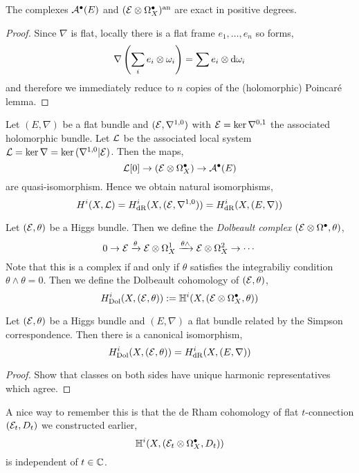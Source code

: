 \documentclass[12pt]{article}
\begin{document}
\begin{lemma}[Poincar\'{e}]
The complexes $\mathcal{A}^\bullet(E)$ and $(\mathcal{E} \otimes \Omega_X^\bullet)^{\mathrm{an}}$ are exact in positive degrees.
\end{lemma}

\begin{proof}
Since $\nabla$ is flat, locally there is a flat frame $e_1, \dots, e_n$ so forms,
\[ \nabla \left( \sum_i e_i \otimes \omega_i \right) = \sum e_i \otimes \mathrm{d}{\omega_i} \]
and therefore we immediately reduce to $n$ copies of the (holomorphic) Poincar\'{e} lemma. 
\end{proof}

\begin{cor}
Let $(E, \nabla)$ be a flat bundle and $(\mathcal{E}, \nabla^{1,0})$ with $\mathcal{E} = \ker{\nabla^{0,1}}$ the associated holomorphic bundle. Let $\mathcal{L}$ be the associated local system $\mathcal{L} = \ker{\nabla} = \ker{(\nabla^{1,0} | \mathcal{E})}$. Then the maps,
\[ \mathcal{L}[0] \to (\mathcal{E} \otimes \Omega_X^\bullet) \to \mathcal{A}^\bullet(E) \]
are quasi-isomorphism. Hence we obtain natural isomorphisms,
\[ H^i(X, \mathcal{L}) = H^i_{\mathrm{dR}}(X, (\mathcal{E}, \nabla^{1,0})) = H^i_{\mathrm{dR}}(X, (E, \nabla)) \]
\end{cor}

\begin{defn}
Let $(\mathcal{E}, \theta)$ be a Higgs bundle. Then we define the \textit{Dolbeault complex} $(\mathcal{E} \otimes \Omega^\bullet, \theta)$,
\[ 0 \to \mathcal{E} \xrightarrow{\theta} \mathcal{E} \otimes \Omega^1_X \xrightarrow{\theta \wedge} \mathcal{E} \otimes \Omega^2_X \to \cdots \]
Note that this is a complex if and only if $\theta$ satisfies the integrabiliy condition $\theta \wedge \theta = 0$. Then we define the Dolbeault cohomology of $(\mathcal{E}, \theta)$,
\[ H_{\mathrm{Dol}}^i(X, (\mathcal{E}, \theta)) := \mathbb{H}^i(X, (\mathcal{E} \otimes \Omega_X^\bullet, \theta)) \]
\end{defn}

\begin{theorem}
Let $(\mathcal{E}, \theta)$ be a Higgs bundle and $(E, \nabla)$ a flat bundle related by the Simpson correspondence. Then there is a canonical isomorphism,
\[ H^i_{\mathrm{Dol}}(X, (\mathcal{E}, \theta)) = H^i_{\mathrm{dR}}(X, (E, \nabla)) \]
\end{theorem}

\begin{proof}
Show that classes on both sides have unique harmonic representatives which agree. 
\end{proof}

\begin{rmk}
A nice way to remember this is that the de Rham cohomology of flat $t$-connection $(\mathcal{E}_t, D_t)$ we constructed earlier,
\[ \mathbb{H}^i(X, (\mathcal{E}_t \otimes \Omega_X^\bullet, D_t)) \]
is independent of $t \in \mathbb{C}$.
\end{rmk}
\end{document}
